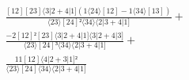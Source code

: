 \documentclass[varwidth, border=5pt]{standalone}
\begin{document}
\begin{my}
$\begin{gathered}
\scriptscriptstyle\frac{[12][23]⟨3|2+4|1](1⟨24⟩[12]-1⟨34⟩[13])}{⟨23⟩[24]²⟨34⟩⟨2|3+4|1]} +\\
\scriptscriptstyle\frac{-2[12]²[23]⟨3|2+4|1]⟨3|2+4|3]}{⟨23⟩[24]³⟨34⟩⟨2|3+4|1]} +\\
\scriptscriptstyle\frac{11[12]⟨4|2+3|1]²}{⟨23⟩[24]⟨34⟩⟨2|3+4|1]} \phantom{+}
\end{gathered}$
\end{my}
\end{document}
